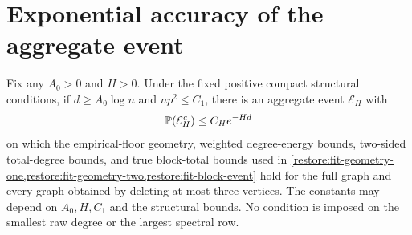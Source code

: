 \section{Exponential accuracy of the aggregate event}
\label{sec:high-range}

\begin{lemma}
\label{restore:high-aggregate}
Fix any $A_0>0$ and $H>0$. Under the fixed positive compact structural
conditions, if $d\ge A_0\log n$ and $np^2\le C_1$, there is an aggregate
event $\mathcal E_H$ with
\[
 \mathbb P(\mathcal E_H^c)\le C_H e^{-Hd}
\]
on which the empirical-floor geometry, weighted degree-energy bounds,
two-sided total-degree bounds, and true block-total bounds used in
\cref{restore:fit-geometry-one,restore:fit-geometry-two,restore:fit-block-event}
hold for the full graph and every graph obtained by deleting at most three
vertices. The constants may depend on $A_0,H,C_1$ and the structural
bounds. No condition is imposed on the smallest raw degree or the
largest spectral row.
\end{lemma}


